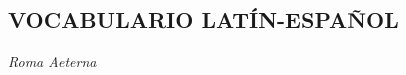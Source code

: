 \documentclass{article}
\newcommand{\ita}[1]{\textit{#1}}
\begin{document}
\begin{center}
\section*{\Large VOCABULARIO LATÍN-ESPAÑOL}
\Large\ita{Roma Aeterna}
\end{center}

\glsaddall
\printnoidxglossary[title={}]
\end{document}
